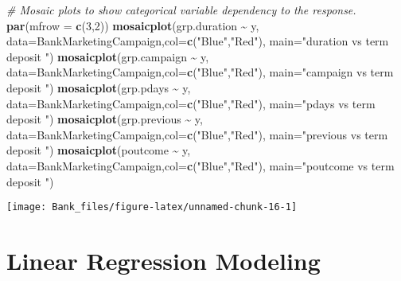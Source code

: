 \documentclass[
]{article}
\newenvironment{Shaded}{\begin{snugshade}}{\end{snugshade}}
\newcommand{\AttributeTok}[1]{\textcolor[rgb]{0.13,0.29,0.53}{#1}}
\newcommand{\CommentTok}[1]{\textcolor[rgb]{0.56,0.35,0.01}{\textit{#1}}}
\newcommand{\DecValTok}[1]{\textcolor[rgb]{0.00,0.00,0.81}{#1}}
\newcommand{\FunctionTok}[1]{\textcolor[rgb]{0.13,0.29,0.53}{\textbf{#1}}}
\newcommand{\NormalTok}[1]{#1}
\newcommand{\SpecialCharTok}[1]{\textcolor[rgb]{0.81,0.36,0.00}{\textbf{#1}}}
\newcommand{\StringTok}[1]{\textcolor[rgb]{0.31,0.60,0.02}{#1}}
\begin{document}
\begin{Shaded}
\begin{Highlighting}[]
\CommentTok{\# Mosaic plots to show categorical variable dependency to the response.}
\FunctionTok{par}\NormalTok{(}\AttributeTok{mfrow =} \FunctionTok{c}\NormalTok{(}\DecValTok{3}\NormalTok{,}\DecValTok{2}\NormalTok{))}
\FunctionTok{mosaicplot}\NormalTok{(grp.duration }\SpecialCharTok{\textasciitilde{}}\NormalTok{ y, }\AttributeTok{data=}\NormalTok{BankMarketingCampaign,}\AttributeTok{col=}\FunctionTok{c}\NormalTok{(}\StringTok{"Blue"}\NormalTok{,}\StringTok{"Red"}\NormalTok{), }\AttributeTok{main=}\StringTok{"duration vs term deposit "}\NormalTok{)}
\FunctionTok{mosaicplot}\NormalTok{(grp.campaign }\SpecialCharTok{\textasciitilde{}}\NormalTok{ y, }\AttributeTok{data=}\NormalTok{BankMarketingCampaign,}\AttributeTok{col=}\FunctionTok{c}\NormalTok{(}\StringTok{"Blue"}\NormalTok{,}\StringTok{"Red"}\NormalTok{), }\AttributeTok{main=}\StringTok{"campaign vs term deposit "}\NormalTok{)}
\FunctionTok{mosaicplot}\NormalTok{(grp.pdays }\SpecialCharTok{\textasciitilde{}}\NormalTok{ y, }\AttributeTok{data=}\NormalTok{BankMarketingCampaign,}\AttributeTok{col=}\FunctionTok{c}\NormalTok{(}\StringTok{"Blue"}\NormalTok{,}\StringTok{"Red"}\NormalTok{), }\AttributeTok{main=}\StringTok{"pdays vs term deposit "}\NormalTok{)}
\FunctionTok{mosaicplot}\NormalTok{(grp.previous }\SpecialCharTok{\textasciitilde{}}\NormalTok{ y, }\AttributeTok{data=}\NormalTok{BankMarketingCampaign,}\AttributeTok{col=}\FunctionTok{c}\NormalTok{(}\StringTok{"Blue"}\NormalTok{,}\StringTok{"Red"}\NormalTok{), }\AttributeTok{main=}\StringTok{"previous vs term deposit "}\NormalTok{)}
\FunctionTok{mosaicplot}\NormalTok{(poutcome }\SpecialCharTok{\textasciitilde{}}\NormalTok{ y, }\AttributeTok{data=}\NormalTok{BankMarketingCampaign,}\AttributeTok{col=}\FunctionTok{c}\NormalTok{(}\StringTok{"Blue"}\NormalTok{,}\StringTok{"Red"}\NormalTok{), }\AttributeTok{main=}\StringTok{"poutcome vs term deposit "}\NormalTok{)}
\end{Highlighting}
\end{Shaded}

\begin{center}\texttt{[image: Bank\_files/figure-latex/unnamed-chunk-16-1]} \end{center}

\section{Linear Regression Modeling}\label{linear-regression-modeling}
\end{document}
